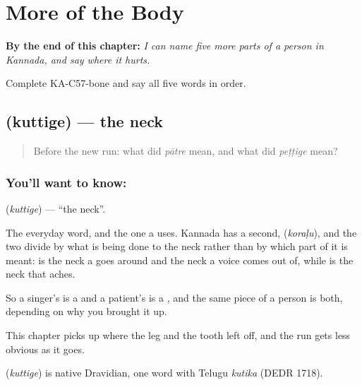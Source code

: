 
\chapter{More of the Body}
\label{ch:ka-more-body}

\begin{chapteropening}
\textbf{By the end of this chapter:} \emph{I can name five more parts of a person in Kannada, and say where it hurts.}

Complete KA-C57-bone and say all five words in order.
\end{chapteropening}

\section[\texorpdfstring{\kn{ಕುತ್ತಿಗೆ} (kuttige)}{ಕುತ್ತಿಗೆ (kuttige)}]{ (kuttige) — the neck}

\label{lesson:KA-C57-neck}



\begin{quote}
Before the new run: what did \emph{pātre} mean, and what did \emph{peṭṭige} mean?
\end{quote}

\subsection*{You'll want to know: }
\textbf{} (\emph{kuttige}) — \textquotedblleft{}the neck\textquotedblright{}.

The everyday word, and the one a  uses. Kannada has a second,  (\emph{koraḷu}), and the two divide by what is being done to the neck rather than by which part of it is meant:  is the neck a  goes around and the neck a voice comes out of, while  is the neck that aches.

So a singer's is a  and a patient's is a , and the same piece of a person is both, depending on why you brought it up.

This chapter picks up where the leg and the tooth left off, and the run gets less obvious as it goes.

\begin{cousinweb}
\textbf{} (\emph{kuttige}) is native Dravidian, one word with Telugu \emph{kutika} (DEDR 1718).
\end{cousinweb}

